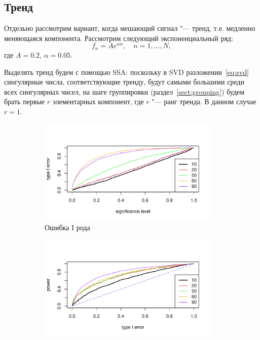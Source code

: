 \documentclass[specialist,
substylefile = spbu_report.rtx,
subf,href,colorlinks=true, 12pt]{disser}
\theoremstyle{definition}
\begin{document}
\subsection{Тренд}
Отдельно рассмотрим вариант, когда мешающий сигнал "--- тренд, т.е. медленно меняющаяся компонента. Рассмотрим следующий экспоненциальный ряд:
\[
f_n=A e^{\alpha n},\quad n=1,\ldots,N,
\] 
где $A=0.2$, $\alpha=0.05$. 

Выделять тренд будем с помощью SSA: поскольку в SVD разложении~\eqref{eq:svd} сингулярные числа, соответствующие тренду, будут самыми большими среди всех сингулярных чисел, на шаге группировки (раздел~\ref{sect:grouping}) будем брать первые $r$ элементарных компонент, где $r$ "--- ранг тренда. В данном случае $r=1$.

\begin{figure}[h!]
	\captionsetup[subfigure]{justification=Centering}
	\begin{subfigure}[t]{0.5\textwidth}
		\centering
		\includegraphics[width=0.95\textwidth]{img/type1error_trend.pdf}
		\caption{Ошибка I рода}
		\label{fig:trend_type1error}
	\end{subfigure}\hspace{\fill}
	\begin{subfigure}[t]{0.5\textwidth}
		\centering
		\includegraphics[width=0.95\textwidth]{img/roc_trend.pdf}

\end{subfigure}
\end{figure}
\end{document}
